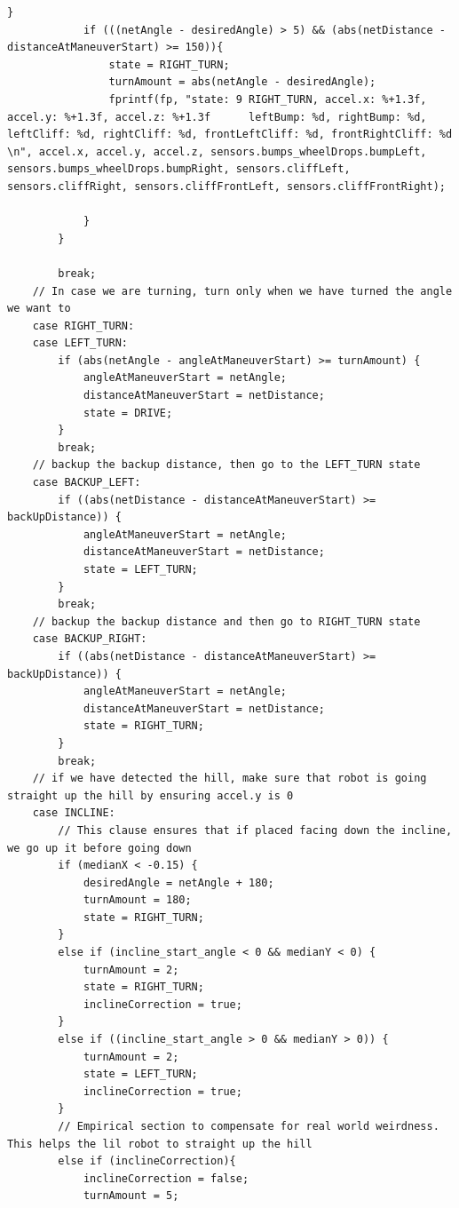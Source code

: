 \documentclass[twoside]{article}
\begin{document}
\begin{lstlisting}[mathescape, frame=single]
            }
            if (((netAngle - desiredAngle) > 5) && (abs(netDistance - distanceAtManeuverStart) >= 150)){
                state = RIGHT_TURN;
                turnAmount = abs(netAngle - desiredAngle);
                fprintf(fp, "state: 9 RIGHT_TURN, accel.x: %+1.3f, accel.y: %+1.3f, accel.z: %+1.3f      leftBump: %d, rightBump: %d, leftCliff: %d, rightCliff: %d, frontLeftCliff: %d, frontRightCliff: %d \n", accel.x, accel.y, accel.z, sensors.bumps_wheelDrops.bumpLeft, sensors.bumps_wheelDrops.bumpRight, sensors.cliffLeft, sensors.cliffRight, sensors.cliffFrontLeft, sensors.cliffFrontRight);

            }
        }

        break;
	// In case we are turning, turn only when we have turned the angle we want to
    case RIGHT_TURN:
    case LEFT_TURN:
        if (abs(netAngle - angleAtManeuverStart) >= turnAmount) {
            angleAtManeuverStart = netAngle;
            distanceAtManeuverStart = netDistance;
            state = DRIVE;
        }
        break;
	// backup the backup distance, then go to the LEFT_TURN state
    case BACKUP_LEFT:
        if ((abs(netDistance - distanceAtManeuverStart) >= backUpDistance)) {
            angleAtManeuverStart = netAngle;
            distanceAtManeuverStart = netDistance;
            state = LEFT_TURN;
        }
        break;
	// backup the backup distance and then go to RIGHT_TURN state
    case BACKUP_RIGHT:
        if ((abs(netDistance - distanceAtManeuverStart) >= backUpDistance)) {
            angleAtManeuverStart = netAngle;
            distanceAtManeuverStart = netDistance;
            state = RIGHT_TURN;
        }
        break;
	// if we have detected the hill, make sure that robot is going straight up the hill by ensuring accel.y is 0
    case INCLINE:
		// This clause ensures that if placed facing down the incline, we go up it before going down
        if (medianX < -0.15) {
            desiredAngle = netAngle + 180;
            turnAmount = 180;
            state = RIGHT_TURN;
        }
        else if (incline_start_angle < 0 && medianY < 0) {
            turnAmount = 2;
            state = RIGHT_TURN;
            inclineCorrection = true;
        }
        else if ((incline_start_angle > 0 && medianY > 0)) {
            turnAmount = 2;
            state = LEFT_TURN;
            inclineCorrection = true;
        }
		// Empirical section to compensate for real world weirdness. This helps the lil robot to straight up the hill
        else if (inclineCorrection){
            inclineCorrection = false;
            turnAmount = 5;

\end{lstlisting}
\end{document}
